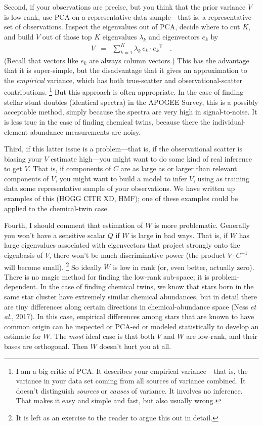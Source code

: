 \documentclass[12pt,letterpaper]{article}
\newcommand{\foreign}[1]{\textsl{#1}}
\newcommand{\acronym}[1]{{\small{#1}}}
\newcommand{\etal}{\foreign{et al.}}
\newcommand{\tra}[1]{{#1}^{\mathsf{T}}}
\newcommand{\inv}[1]{{#1}^{-1}}
\begin{document}
Second, if your observations are precise, but you think that the prior
variance $V$ is low-rank, use \acronym{PCA} on a representative data
sample---that is, a representative set of observations. Inspect the
eigenvalues out of \acronym{PCA}, decide where to cut $K$, and build
$V$ out of those top $K$ eigenvalues $\lambda_k$ and eigenvectors $e_k$ by
\begin{eqnarray}
  V &=& \sum_{k=1}^K \lambda_k\,e_k\cdot\tra{e_k}
\quad .
\end{eqnarray}
(Recall that vectors like $e_k$ are always column vectors.)
This has the advantage that it is super-simple, but the
disadvantage that it gives an approximation to the
\emph{empirical} variance, which has both true-scatter and
observational-scatter contributions.%
\footnote{I am a big critic of \acronym{PCA}. It describes your
  empirical variance---that is, the variance in your data set coming
  from all sources of variance combined. It doesn't distinguish
  \emph{sources} or \emph{causes} of variance. It involves no
  inference. That makes it easy and simple and fast, but also usually
  wrong.}
But this approach is often
appropriate. In the case of finding stellar stunt doubles (identical
spectra) in the \acronym{APOGEE} Survey, this is a possibly acceptable
method, simply because the spectra are very high in
signal-to-noise. It is less true in the case of finding chemical
twins, because there the individual-element abundance measurements are
noisy.

Third, if this latter issue is a problem---that is, if the
observational scatter is biasing your $V$ estimate high---you might
want to do some kind of real inference to get $V$. That is, if
components of $C$ are as large as or larger than relevant components
of $V$, you might want to build a model to infer $V$, using as
training data some representative sample of your observations. We have
written up examples of this (HOGG CITE XD, HMF); one of these examples
could be applied to the chemical-twin case.

Fourth, I should comment that estimation of $W$ is more
problematic. Generally you won't have a sensitive scalar $Q$ if $W$ is
large in bad ways. That is, if $W$ has large eigenvalues associated
with eigenvectors that project strongly onto the eigenbasis of $V$,
there won't be much discriminative power (the product $V\cdot\inv{C}$
will become small).%
\footnote{It is left as an exercise to the reader to argue this out in detail.}
So ideally $W$ is low in rank (or, even better,
actually zero). There is no magic
method for finding the low-rank sub-space; it is problem-dependent. In
the case of finding chemical twins, we know that stars born in the
same star cluster have extremely similar chemical abundances, but in
detail there are tiny differences along certain directions in
chemical-abundance space (Ness \etal, 2017). In this case, empirical
differences among stars that are known to have common origin can be
inspected or \acronym{PCA}-ed or modeled statistically to develop an
estimate for $W$. The \emph{most} ideal case is that both $V$ and $W$
are low-rank, and their bases are orthogonal. Then $W$ doesn't hurt
you at all.
\end{document}
